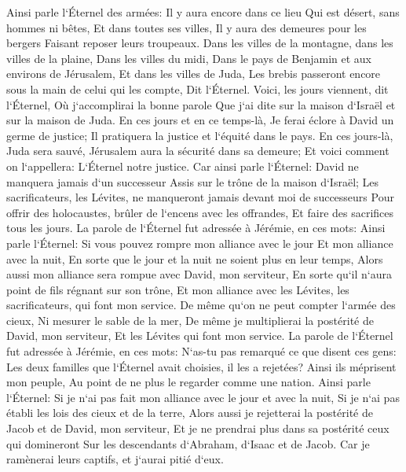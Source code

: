 \verse Ainsi parle l`Éternel des armées: Il y aura encore dans ce lieu Qui est désert, sans hommes ni bêtes, Et dans toutes ses villes, Il y aura des demeures pour les bergers Faisant reposer leurs troupeaux. 
\verse Dans les villes de la montagne, dans les villes de la plaine, Dans les villes du midi, Dans le pays de Benjamin et aux environs de Jérusalem, Et dans les villes de Juda, Les brebis passeront encore sous la main de celui qui les compte, Dit l`Éternel. 
\verse Voici, les jours viennent, dit l`Éternel, Où j`accomplirai la bonne parole Que j`ai dite sur la maison d`Israël et sur la maison de Juda. 
\verse En ces jours et en ce temps-là, Je ferai éclore à David un germe de justice; Il pratiquera la justice et l`équité dans le pays. 
\verse En ces jours-là, Juda sera sauvé, Jérusalem aura la sécurité dans sa demeure; Et voici comment on l`appellera: L`Éternel notre justice. 
\verse Car ainsi parle l`Éternel: David ne manquera jamais d`un successeur Assis sur le trône de la maison d`Israël; 
\verse Les sacrificateurs, les Lévites, ne manqueront jamais devant moi de successeurs Pour offrir des holocaustes, brûler de l`encens avec les offrandes, Et faire des sacrifices tous les jours. 
\verse La parole de l`Éternel fut adressée à Jérémie, en ces mots: 
\verse Ainsi parle l`Éternel: Si vous pouvez rompre mon alliance avec le jour Et mon alliance avec la nuit, En sorte que le jour et la nuit ne soient plus en leur temps, 
\verse Alors aussi mon alliance sera rompue avec David, mon serviteur, En sorte qu`il n`aura point de fils régnant sur son trône, Et mon alliance avec les Lévites, les sacrificateurs, qui font mon service. 
\verse De même qu`on ne peut compter l`armée des cieux, Ni mesurer le sable de la mer, De même je multiplierai la postérité de David, mon serviteur, Et les Lévites qui font mon service. 
\verse La parole de l`Éternel fut adressée à Jérémie, en ces mots: 
\verse N`as-tu pas remarqué ce que disent ces gens: Les deux familles que l`Éternel avait choisies, il les a rejetées? Ainsi ils méprisent mon peuple, Au point de ne plus le regarder comme une nation. 
\verse Ainsi parle l`Éternel: Si je n`ai pas fait mon alliance avec le jour et avec la nuit, Si je n`ai pas établi les lois des cieux et de la terre, 
\verse Alors aussi je rejetterai la postérité de Jacob et de David, mon serviteur, Et je ne prendrai plus dans sa postérité ceux qui domineront Sur les descendants d`Abraham, d`Isaac et de Jacob. Car je ramènerai leurs captifs, et j`aurai pitié d`eux. 

